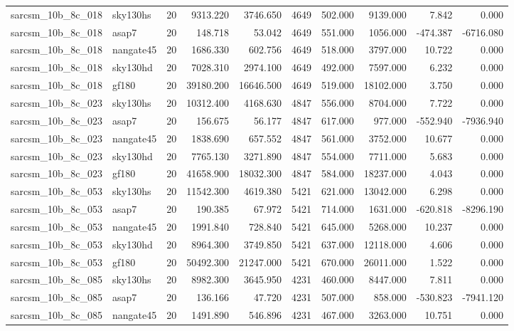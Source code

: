 \documentclass{article}
\begin{document}
\begin{longtable}{llrrrrrrrr}
sarcsm\_10b\_8c\_018 & sky130hs & 20 & 9313.220 & 3746.650 & 4649 & 502.000 & 9139.000 & 7.842 & 0.000 \\
sarcsm\_10b\_8c\_018 & asap7 & 20 & 148.718 & 53.042 & 4649 & 551.000 & 1056.000 & -474.387 & -6716.080 \\
sarcsm\_10b\_8c\_018 & nangate45 & 20 & 1686.330 & 602.756 & 4649 & 518.000 & 3797.000 & 10.722 & 0.000 \\
sarcsm\_10b\_8c\_018 & sky130hd & 20 & 7028.310 & 2974.100 & 4649 & 492.000 & 7597.000 & 6.232 & 0.000 \\
sarcsm\_10b\_8c\_018 & gf180 & 20 & 39180.200 & 16646.500 & 4649 & 519.000 & 18102.000 & 3.750 & 0.000 \\
sarcsm\_10b\_8c\_023 & sky130hs & 20 & 10312.400 & 4168.630 & 4847 & 556.000 & 8704.000 & 7.722 & 0.000 \\
sarcsm\_10b\_8c\_023 & asap7 & 20 & 156.675 & 56.177 & 4847 & 617.000 & 977.000 & -552.940 & -7936.940 \\
sarcsm\_10b\_8c\_023 & nangate45 & 20 & 1838.690 & 657.552 & 4847 & 561.000 & 3752.000 & 10.677 & 0.000 \\
sarcsm\_10b\_8c\_023 & sky130hd & 20 & 7765.130 & 3271.890 & 4847 & 554.000 & 7711.000 & 5.683 & 0.000 \\
sarcsm\_10b\_8c\_023 & gf180 & 20 & 41658.900 & 18032.300 & 4847 & 584.000 & 18237.000 & 4.043 & 0.000 \\
sarcsm\_10b\_8c\_053 & sky130hs & 20 & 11542.300 & 4619.380 & 5421 & 621.000 & 13042.000 & 6.298 & 0.000 \\
sarcsm\_10b\_8c\_053 & asap7 & 20 & 190.385 & 67.972 & 5421 & 714.000 & 1631.000 & -620.818 & -8296.190 \\
sarcsm\_10b\_8c\_053 & nangate45 & 20 & 1991.840 & 728.840 & 5421 & 645.000 & 5268.000 & 10.237 & 0.000 \\
sarcsm\_10b\_8c\_053 & sky130hd & 20 & 8964.300 & 3749.850 & 5421 & 637.000 & 12118.000 & 4.606 & 0.000 \\
sarcsm\_10b\_8c\_053 & gf180 & 20 & 50492.300 & 21247.000 & 5421 & 670.000 & 26011.000 & 1.522 & 0.000 \\
sarcsm\_10b\_8c\_085 & sky130hs & 20 & 8982.300 & 3645.950 & 4231 & 460.000 & 8447.000 & 7.811 & 0.000 \\
sarcsm\_10b\_8c\_085 & asap7 & 20 & 136.166 & 47.720 & 4231 & 507.000 & 858.000 & -530.823 & -7941.120 \\
sarcsm\_10b\_8c\_085 & nangate45 & 20 & 1491.890 & 546.896 & 4231 & 467.000 & 3263.000 & 10.751 & 0.000 \\

\end{longtable}
\end{document}
